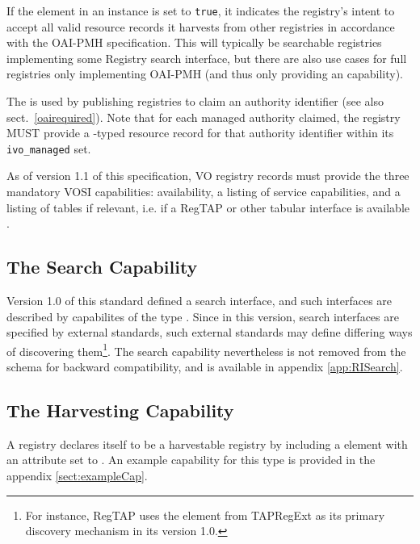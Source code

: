 \documentclass{ivoa}
\begin{document}
If the  element in an  instance
is set to \texttt{true}, it indicates the registry's intent to
accept all valid resource records it harvests from other
registries in accordance with the OAI-PMH specification.  This will
typically be searchable registries implementing some Registry search
interface, but there are also use cases for full registries only
implementing OAI-PMH (and thus only providing an  
capability).

The  is used by publishing registries  to
claim an authority identifier (see also sect.~\ref{oairequired}).  Note
that for each managed authority claimed, the registry MUST provide a
-typed resource record for that authority identifier
within its \texttt{ivo\_managed} set.

As of version 1.1 of this specification, VO registry records must provide
the three mandatory VOSI capabilities: availability, a listing of
service capabilities, and a listing of tables if relevant, i.e. if a
RegTAP or other tabular interface is available \citep{std:VOSI}.


\subsection{The Search Capability}
\label{sect:vgsearch}

Version 1.0 of this standard defined a search interface, and such
interfaces are described by capabilites of the type .
Since in this version, search interfaces are specified by external
standards, such external standards may define differing ways of
discovering them\footnote{For instance, RegTAP \citep{std:RegTAP} uses
the  element from TAPRegExt as its primary
discovery mechanism in its version 1.0.}.  The search capability nevertheless is 
not removed from the schema for backward compatibility, and is available in appendix
\ref{app:RISearch}.

\subsection{The Harvesting Capability}

\label{sect:vgharvest}

A registry declares itself to be a harvestable registry by including a
 element with an  
attribute set to . An example capability for this
type is provided in the appendix \ref{sect:exampleCap}.
\end{document}
